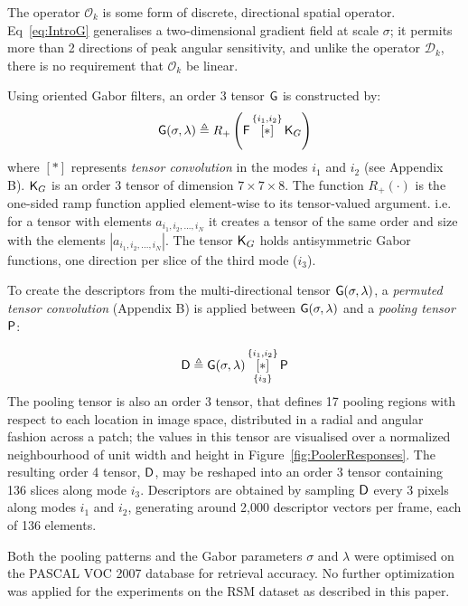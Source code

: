 The operator $\mathcal{O}_k$ is some form of discrete, directional spatial operator. Eq~\ref{eq:IntroG} generalises a two-dimensional gradient field at scale $\sigma$; it permits more than 2 directions of peak angular sensitivity, and unlike the operator $\mathcal{D}_k$, there is no requirement that $\mathcal{O}_k$ be linear.

Using oriented Gabor filters, an order 3 tensor $\mathsf{G}$ is constructed by:
\begin{equation}
\mathsf{G}(\sigma,\lambda) \triangleq R_+ \left ( \mathsf{F} \, \overset{\lbrace i_1,i_2\rbrace}{[ \ast ]}\, {\mathsf{K}_{G}} \right )
\end{equation}
where $[ \ast ]$ represents {\it tensor convolution} in the modes $i_1$ and $i_2$ (see Appendix B). $\mathsf{K}_{G}$ is an order 3 tensor of dimension $7 \times 7 \times 8$. The function $R_+(\cdot)$ is the one-sided ramp function applied element-wise to its tensor-valued argument. i.e. for a tensor with elements $a_{i_1,i_2,...,i_N}$ it creates a tensor of the same order and size with the elements $|a_{i_1,i_2,...,i_N}|$.  The tensor $\mathsf{K}_{G}$ holds antisymmetric Gabor functions, one direction per slice of the third mode ($i_3$). 

To create the descriptors from the multi-directional tensor $\mathsf{G}(\sigma,\lambda)$, a {\it permuted tensor convolution} (Appendix B) is applied between $\mathsf{G}(\sigma,\lambda)$ and a {\it pooling tensor} $\mathsf{P}$:  

\begin{equation}
\mathsf{D} \triangleq \mathsf{G}(\sigma,\lambda) \, 
   \underset{\lbrace i_3 \rbrace}{\overset{\lbrace i_1,i_2\rbrace}{[ \ast ]}}\, {\mathsf{P}}
\end{equation}
The pooling tensor is also an order 3 tensor, that defines 17 pooling regions with respect to each location in image space, distributed in a radial and angular fashion across a patch; the values in this tensor are visualised over a normalized neighbourhood of unit width and height in Figure~\ref{fig:PoolerResponses}. The resulting order 4 tensor, $\mathsf{D}$, may be reshaped \citep{kolda2009tensor} into an order 3 tensor containing 136 slices along mode $i_3$. Descriptors are obtained by sampling $\mathsf{D}$ every 3 pixels along modes $i_1$ and $i_2$, generating around 2,000 descriptor vectors per frame, each of 136 elements.

Both the pooling patterns and the Gabor parameters $\sigma$ and $\lambda$ were optimised on the PASCAL VOC 2007 database \citep{everingham2010pascal} for retrieval accuracy. No further optimization was applied for the experiments on the RSM dataset as described in this paper.

